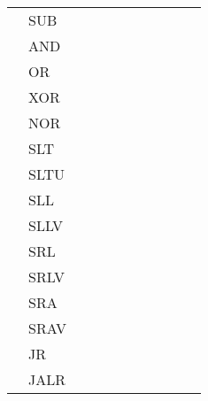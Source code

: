 \begin{table}[]
\begin{tabular}{lllllllllll}
          & SUB   &      &       &       &      &      &      &    &       &                           \\
          & AND   &      &       &       &      &      &      &    &       &                           \\
          & OR    &      &       &       &      &      &      &    &       &                           \\
          & XOR   &      &       &       &      &      &      &    &       &                           \\
          & NOR   &      &       &       &      &      &      &    &       &                           \\
          & SLT   &      &       &       &      &      &      &    &       &                           \\
          & SLTU  &      &       &       &      &      &      &    &       &                           \\
          & SLL   &      &       &       &      &      &      &    &       &                           \\
          & SLLV  &      &       &       &      &      &      &    &       &                           \\
          & SRL   &      &       &       &      &      &      &    &       &                           \\
          & SRLV  &      &       &       &      &      &      &    &       &                           \\
          & SRA   &      &       &       &      &      &      &    &       &                           \\
          & SRAV  &      &       &       &      &      &      &    &       &                           \\
          & JR    &      &       &       &      &      &      &    &       &                           \\
          & JALR  &      &       &       &      &      &      &    &       &                          
   \end{tabular}
   \end{table}